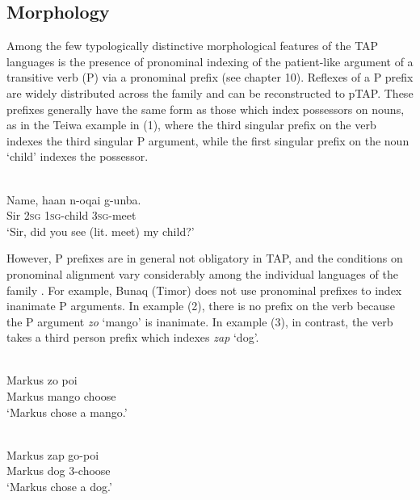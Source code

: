 \subsection{Morphology} \label{sec:4:2.2}
Among the few typologically distinctive morphological features of the TAP languages is the presence of pronominal indexing of the patient-like argument of a transitive verb (P) via a pronominal prefix (see chapter 10). Reflexes of a P prefix are widely distributed across the family and can be reconstructed to pTAP. These prefixes generally have the same form as those which index possessors on nouns, as in the Teiwa example in (1), where the third singular prefix on the verb indexes the third singular P argument, while the first singular prefix on the noun `child' indexes the possessor.

\ea%
 \\
\gll  Name, ha{\textglotstop}an n-oqai g-unba{\textglotstop}. \\
  Sir \textsc{2sg} \textsc{1sg}-child \textsc{3sg}-meet  \\
\glt `Sir, did you see (lit. meet) my child?'
\z




However, P prefixes are in general not obligatory in TAP, and the conditions on pronominal alignment vary considerably among the individual languages of the family \citep[chapter 10]{FeddenEtAl2013}. For example, Bunaq (Timor) does not use pronominal prefixes to index inanimate P arguments. In example (2), there is no prefix on the verb because the P argument \textit{zo} `mango' is inanimate. In example (3), in contrast, the verb takes a third person prefix which indexes \textit{zap} `dog'.

\ea%
 \\
\gll  Markus zo poi \\
   Markus mango  choose \\
\glt `Markus chose a mango.'
\z





\ea%
 \\
\gll  Markus zap go-poi \\
    Markus dog \textsc{3}-choose\\
\glt `Markus chose a dog.'
\z




